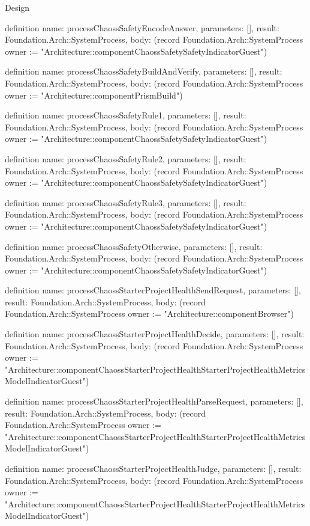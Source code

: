 \begin{lexlean}{Design}
\begin{semanticmodule}
definition{
  name: processChaossSafetyEncodeAnswer,
  parameters: [],
  result: Foundation.Arch::SystemProcess,
  body: (record Foundation.Arch::SystemProcess {owner := "Architecture::componentChaossSafetySafetyIndicatorGuest"})
}

definition{
  name: processChaossSafetyBuildAndVerify,
  parameters: [],
  result: Foundation.Arch::SystemProcess,
  body: (record Foundation.Arch::SystemProcess {owner := "Architecture::componentPrismBuild"})
}

definition{
  name: processChaossSafetyRule1,
  parameters: [],
  result: Foundation.Arch::SystemProcess,
  body: (record Foundation.Arch::SystemProcess {owner := "Architecture::componentChaossSafetySafetyIndicatorGuest"})
}

definition{
  name: processChaossSafetyRule2,
  parameters: [],
  result: Foundation.Arch::SystemProcess,
  body: (record Foundation.Arch::SystemProcess {owner := "Architecture::componentChaossSafetySafetyIndicatorGuest"})
}

definition{
  name: processChaossSafetyRule3,
  parameters: [],
  result: Foundation.Arch::SystemProcess,
  body: (record Foundation.Arch::SystemProcess {owner := "Architecture::componentChaossSafetySafetyIndicatorGuest"})
}

definition{
  name: processChaossSafetyOtherwise,
  parameters: [],
  result: Foundation.Arch::SystemProcess,
  body: (record Foundation.Arch::SystemProcess {owner := "Architecture::componentChaossSafetySafetyIndicatorGuest"})
}

definition{
  name: processChaossStarterProjectHealthSendRequest,
  parameters: [],
  result: Foundation.Arch::SystemProcess,
  body: (record Foundation.Arch::SystemProcess {owner := "Architecture::componentBrowser"})
}

definition{
  name: processChaossStarterProjectHealthDecide,
  parameters: [],
  result: Foundation.Arch::SystemProcess,
  body: (record Foundation.Arch::SystemProcess {owner := "Architecture::componentChaossStarterProjectHealthStarterProjectHealthMetricsModelIndicatorGuest"})
}

definition{
  name: processChaossStarterProjectHealthParseRequest,
  parameters: [],
  result: Foundation.Arch::SystemProcess,
  body: (record Foundation.Arch::SystemProcess {owner := "Architecture::componentChaossStarterProjectHealthStarterProjectHealthMetricsModelIndicatorGuest"})
}

definition{
  name: processChaossStarterProjectHealthJudge,
  parameters: [],
  result: Foundation.Arch::SystemProcess,
  body: (record Foundation.Arch::SystemProcess {owner := "Architecture::componentChaossStarterProjectHealthStarterProjectHealthMetricsModelIndicatorGuest"})
}


\end{semanticmodule}
\end{lexlean}
